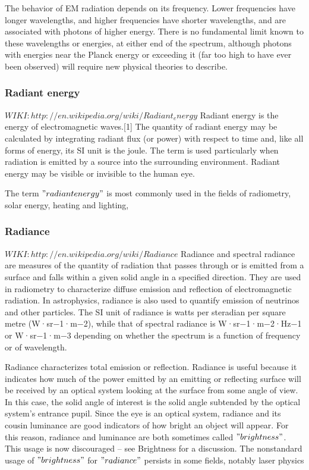 The behavior of EM radiation depends on its frequency. Lower frequencies have longer wavelengths, and higher frequencies have shorter wavelengths, and are associated with photons of higher energy. There is no fundamental limit known to these wavelengths or energies, at either end of the spectrum, although photons with energies near the Planck energy or exceeding it (far too high to have ever been observed) will require new physical theories to describe.

\subsubsection{Radiant energy}
$WIKI: http://en.wikipedia.org/wiki/Radiant_energy$
Radiant energy is the energy of electromagnetic waves.[1] The quantity of radiant energy may be calculated by integrating radiant flux (or power) with respect to time and, like all forms of energy, its SI unit is the joule. The term is used particularly when radiation is emitted by a source into the surrounding environment. Radiant energy may be visible or invisible to the human eye.

The term $"radiant energy"$ is most commonly used in the fields of radiometry, solar energy, heating and lighting,

\subsubsection{Radiance}
$WIKI: http://en.wikipedia.org/wiki/Radiance$
Radiance and spectral radiance are measures of the quantity of radiation that passes through or is emitted from a surface and falls within a given solid angle in a specified direction. They are used in radiometry to characterize diffuse emission and reflection of electromagnetic radiation. In astrophysics, radiance is also used to quantify emission of neutrinos and other particles. The SI unit of radiance is watts per steradian per square metre (W·sr−1·m−2), while that of spectral radiance is W·sr−1·m−2·Hz−1 or W·sr−1·m−3 depending on whether the spectrum is a function of frequency or of wavelength.

Radiance characterizes total emission or reflection. Radiance is useful because it indicates how much of the power emitted by an emitting or reflecting surface will be received by an optical system looking at the surface from some angle of view. In this case, the solid angle of interest is the solid angle subtended by the optical system's entrance pupil. Since the eye is an optical system, radiance and its cousin luminance are good indicators of how bright an object will appear. For this reason, radiance and luminance are both sometimes called $"brightness"$. This usage is now discouraged – see Brightness for a discussion. The nonstandard usage of $"brightness"$ for $"radiance"$ persists in some fields, notably laser physics

